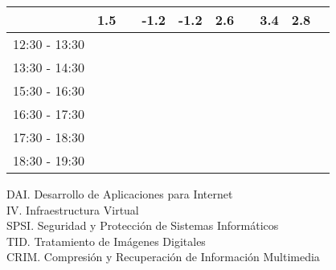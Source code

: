 \documentclass[10pt,spanish, landscape]{article}
\begin{document}
\begin{minipage}{0.7\textwidth}
\begin{tabular}{|c|cc|cc|cc|cc|cc|}
& \multicolumn{2}{|c|}{ \cellcolor{grisclaro} {\footnotesize 1.5}} & {\footnotesize  } & {\footnotesize -1.2} & {\footnotesize -1.2} & {\footnotesize 2.6} & {\footnotesize  } & {\footnotesize 3.4} & {\footnotesize 2.8} & {\footnotesize  }\\ 
 \hline
\multirow{2}{*}{12:30 - 13:30}  &  &  &  &  &  &  &  &  &  & \\ 
 &  &  &  &  &  &  &  &  &  & \\ 
 \hline
\multirow{2}{*}{13:30 - 14:30}  &  &  &  &  &  &  &  &  &  & \\ 
 &  &  &  &  &  &  &  &  &  & \\ 
 \hline
\multirow{2}{*}{15:30 - 16:30}  &  &  &  &  &  &  &  &  &  & \\ 
 &  &  &  &  &  &  &  &  &  & \\ 
 \hline
\multirow{2}{*}{16:30 - 17:30}  &  &  &  &  &  &  &  &  &  & \\ 
 &  &  &  &  &  &  &  &  &  & \\ 
 \hline
\multirow{2}{*}{17:30 - 18:30}  &  &  &  &  &  &  &  &  &  & \\ 
 &  &  &  &  &  &  &  &  &  & \\ 
 \hline
\multirow{2}{*}{18:30 - 19:30}  &  &  &  &  &  &  &  &  &  & \\ 
 &  &  &  &  &  &  &  &  &  & \\ 
 \hline

\end{tabular}
\end{minipage}
\begin{minipage}{0.25\textwidth}
DAI. Desarrollo de Aplicaciones para Internet\\[0.5cm]
IV. Infraestructura Virtual\\[0.5cm]
SPSI. Seguridad y Protección de Sistemas Informáticos\\[0.5cm]
TID. Tratamiento de Imágenes Digitales\\[0.5cm]
CRIM. Compresión y Recuperación de Información Multimedia\\[0.5cm]
\end{minipage}
\newpage
\end{document}
